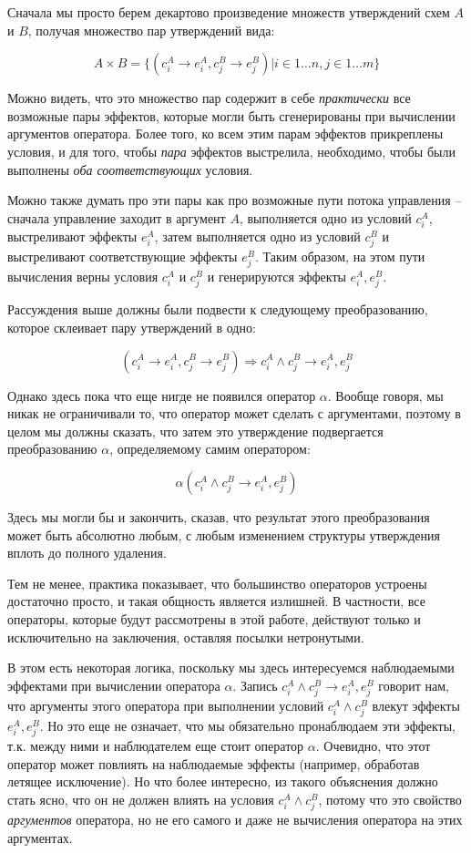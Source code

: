 Сначала мы просто берем декартово произведение множеств утверждений схем $A$ и $B$, получая множество пар утверждений вида: 

$$A \times B = \big\{ (c^A_i \rightarrow e^A_i, c^B_j \rightarrow e^B_j) \rvert i \in 1 \ldots n, j \in 1 \ldots m \big\}$$

Можно видеть, что это множество пар содержит в себе \emph{практически} все возможные пары эффектов, которые могли быть сгенерированы при вычислении аргументов оператора. Более того, ко всем этим парам эффектов прикреплены условия, и для того, чтобы \emph{пара} эффектов выстрелила, необходимо, чтобы были выполнены \emph{оба соответствующих} условия. 

Можно также думать про эти пары как про возможные пути потока управления -- сначала управление заходит в аргумент $A$, выполняется одно из условий $c^A_i$, выстреливают эффекты $e^A_i$, затем выполняется одно из условий $c^B_j$ и выстреливают соответствующие эффекты $e^B_j$. Таким образом, на этом пути вычисления верны условия $c^A_i$ и $c^B_j$ и генерируются эффекты $e^A_i, e^B_j$.

Рассуждения выше должны были подвести к следующему преобразованию, которое склеивает пару утверждений в одно:

$$ (c^A_i \rightarrow e^A_i, c^B_j \rightarrow e^B_j) \Rightarrow c^A_i \land c^B_j \rightarrow e^A_i, e^B_j $$

Однако здесь пока что еще нигде не появился оператор $\alpha$. Вообще говоря, мы никак не ограничивали то, что оператор может сделать с аргументами, поэтому в целом мы должны сказать, что затем это утверждение подвергается преобразованию $\alpha$, определяемому самим оператором:

$$ \alpha(c^A_i \land c^B_j \rightarrow e^A_i, e^B_j) $$ 

Здесь мы могли бы и закончить, сказав, что результат этого преобразования может быть абсолютно любым, с любым изменением структуры утверждения вплоть до полного удаления.

Тем не менее, практика показывает, что большинство операторов устроены достаточно просто, и такая общность является излишней. В частности, все операторы, которые будут рассмотрены в этой работе, действуют только и исключительно на заключения, оставляя посылки нетронутыми.

В этом есть некоторая логика, поскольку мы здесь интересуемся наблюдаемыми эффектами при вычислении оператора $\alpha$. Запись $c^A_i \land c^B_j \rightarrow e^A_i, e^B_j$ говорит нам, что аргументы этого оператора при выполнении условий $c^A_i \land c^B_j$ влекут эффекты $e^A_i, e^B_j$. Но это еще не означает, что мы обязательно пронаблюдаем эти эффекты, т.к. между ними и наблюдателем еще стоит оператор $\alpha$. Очевидно, что этот оператор может повлиять на наблюдаемые эффекты (например, обработав летящее исключение). Но что более интересно, из такого объяснения должно стать ясно, что он не должен влиять на условия $c^A_i \land c^B_j$, потому что это свойство \emph{аргументов} оператора, но не его самого и даже не вычисления оператора на этих аргументах.

